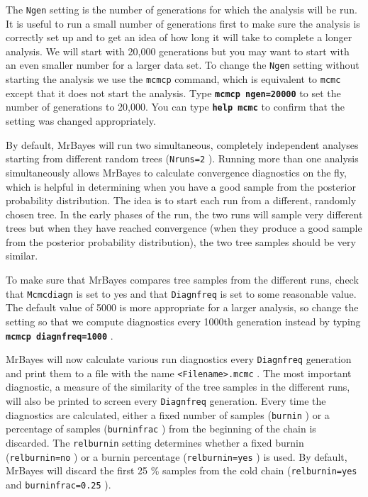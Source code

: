 \documentclass[12pt]{book}
\newcommand{\ttt}[1]{\texttt{#1} }
\newcommand{\tb}[1]{\ttt{\textbf{#1}} }
\begin{document}
The \ttt{Ngen} setting is the number of generations for which the analysis will be run. It is
useful to run a small number of generations first to make sure the analysis is correctly set up and
to get an idea of how long it will take to complete a longer analysis. We will start with 20,000
generations but you may want to start with an even smaller number for a larger data set. To change
the \ttt{Ngen} setting without starting the analysis we use the \ttt{mcmcp} command, which is
equivalent to \ttt{mcmc} except that it does not start the analysis. Type \tb{mcmcp
ngen=20000} to set the number of generations to 20,000. You can type \tb{help mcmc} to confirm
that the setting was changed appropriately.

By default, MrBayes will run two simultaneous, completely independent analyses starting from
different random trees (\ttt{Nruns=2}). Running more than one analysis simultaneously allows
MrBayes to calculate convergence diagnostics on the fly, which is helpful in determining when you
have a good sample from the posterior probability distribution. The idea is to start each run from
a different, randomly chosen tree.  In the early phases of the run, the two runs will sample very
different trees but when they have reached convergence (when they produce a good sample from the
posterior probability distribution), the two tree samples should be very similar.

To make sure that MrBayes compares tree samples from the different runs, check that
\ttt{Mcmcdiagn} is set to yes and that \ttt{Diagnfreq} is set to some reasonable value. The
default value of 5000 is more appropriate for a larger analysis, so change the setting so that we
compute diagnostics every 1000th generation instead by typing \tb{mcmcp diagnfreq=1000}.

MrBayes will now calculate various run diagnostics every \ttt{Diagnfreq} generation and print
them to a file with the name \ttt{<Filename>.mcmc}. The most important diagnostic, a measure of
the similarity of the tree samples in the different runs, will also be printed to screen every
\ttt{Diagnfreq} generation.  Every time the diagnostics are calculated, either a fixed number of
samples (\ttt{burnin}) or a percentage of samples (\ttt{burninfrac}) from the beginning of
the chain is discarded.  The \ttt{relburnin} setting determines whether a fixed burnin
(\ttt{relburnin=no}) or a burnin percentage (\ttt{relburnin=yes}) is used. By default,
MrBayes will discard the first 25 \% samples from the cold chain (\ttt{relburnin=yes} and
\ttt{burninfrac=0.25}).
\end{document}
